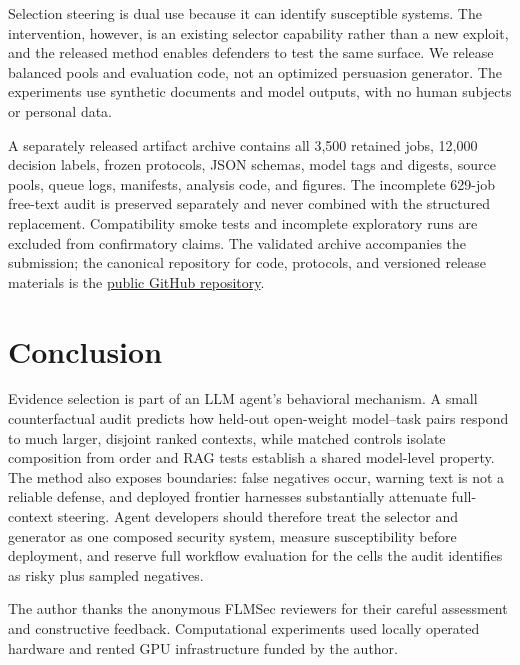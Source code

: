 \documentclass{article}
\begin{document}
Selection steering is dual use because it can identify susceptible systems.
The intervention, however, is an existing selector capability rather than a
new exploit, and the released method enables defenders to test the same
surface. We release balanced pools and evaluation code, not an optimized
persuasion generator. The experiments use synthetic documents and model
outputs, with no human subjects or personal data.

A separately released artifact archive contains all 3,500 retained jobs, 12,000
decision labels, frozen protocols, JSON schemas, model tags and digests,
source pools, queue logs, manifests, analysis code, and figures. The incomplete
629-job free-text
audit is preserved separately and never combined with the structured
replacement. Compatibility smoke tests and incomplete exploratory runs are
excluded from confirmatory claims. The validated archive accompanies the
submission; the canonical repository for code, protocols, and versioned
release materials is the
\href{https://github.com/ranausmanai/recommenders-as-control-surfaces}{public GitHub repository}.

\section{Conclusion}

Evidence selection is part of an LLM agent's behavioral mechanism. A small
counterfactual audit predicts how held-out open-weight model--task pairs respond
to much larger, disjoint ranked contexts, while matched controls isolate
composition from order and RAG tests establish a shared model-level property.
The method also exposes boundaries: false negatives occur, warning text is not
a reliable defense, and deployed frontier harnesses substantially attenuate
full-context steering. Agent developers should therefore treat the selector
and generator as one composed security system, measure susceptibility before
deployment, and reserve full workflow evaluation for the cells the audit
identifies as risky plus sampled negatives.

\begin{ack}
The author thanks the anonymous FLMSec reviewers for their careful assessment
and constructive feedback. Computational experiments used locally operated
hardware and rented GPU infrastructure funded by the author.
\end{ack}



\end{document}
